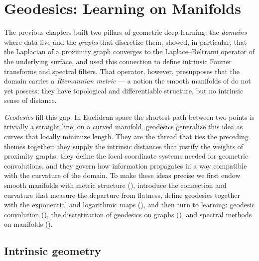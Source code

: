 \providecommand{\Ric}{\operatorname{Ric}}
\providecommand{\divergence}{\operatorname{div}}
\providecommand{\grad}{\operatorname{grad}}
\providecommand{\Exp}{\operatorname{exp}}
\providecommand{\Log}{\operatorname{log}}
\providecommand{\TpM}{T_p\mathcal{M}}
\providecommand{\M}{\mathcal{M}}
\providecommand{\N}{\mathbb{N}}

\chapter{Geodesics: Learning on Manifolds}
\label{ch:geodesics}

The previous chapters built two pillars of geometric deep learning: the
\emph{domains} where data live and the \emph{graphs} that discretize them.
 showed, in particular, that the Laplacian of a proximity graph
converges to the Laplace--Beltrami operator of the underlying surface, and used
this connection to define intrinsic Fourier transforms and spectral filters.
That operator, however, presupposes that the domain carries a \emph{Riemannian
metric} --- a notion the smooth manifolds of  do not yet
possess: they have topological and differentiable structure, but no intrinsic
sense of distance.

\emph{Geodesics} fill this gap. In Euclidean space the shortest path between two
points is trivially a straight line; on a curved manifold, geodesics generalize
this idea as curves that locally minimize length. They are the thread that ties
the preceding themes together: they supply the intrinsic distances that justify
the weights of proximity graphs, they define the local coordinate systems needed
for geometric convolutions, and they govern how information propagates in a way
compatible with the curvature of the domain. To make these ideas precise we
first endow smooth manifolds with metric structure
(), introduce the connection and curvature that measure
the departure from flatness, define geodesics together with the exponential and
logarithmic maps (), and then turn to learning:
geodesic convolution (), the discretization of
geodesics on graphs (), and spectral methods on
manifolds ().

\section{Intrinsic geometry}
\label{sec:geo:intrinsic}

